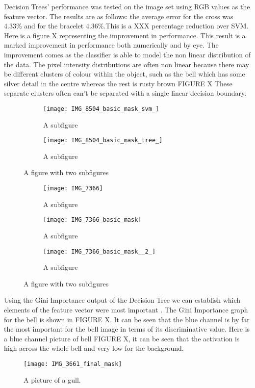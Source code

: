 \documentclass[12pt]{IIBproject}
\begin{document}
 Decision Trees' performance was tested on the image set using RGB values as the feature vector. The results are as follows: the average error for the cross was 4.33\% and for the bracelet 4.36\%.This is a XXX percentage reduction over SVM. Here is a figure X representing the improvement in performance. This result is a marked improvement in performance both numerically and by eye. The improvement comes as the classifier is able to model the non linear distribution of the data. The pixel intensity distributions are often non linear because there may be different clusters of colour within the object, such as the bell which has some silver detail in the centre whereas the rest is rusty brown FIGURE X These separate clusters often can't be separated with a single linear decision boundary.
\begin{figure}[H]
\centering
\begin{subfigure}{.5\textwidth}
  \centering
  \texttt{[image: IMG\_8504\_basic\_mask\_svm\_]}
  \caption{A subfigure}
  \label{fig:sub1}
\end{subfigure}%
\begin{subfigure}{.5\textwidth}
  \centering
  \texttt{[image: IMG\_8504\_basic\_mask\_tree\_]}
  \caption{A subfigure}
  \label{fig:sub2}
\end{subfigure}
\caption{A figure with two subfigures}
\label{fig:test}
\end{figure}
\begin{figure}[H]
\centering
\begin{subfigure}{.33\textwidth}
  \centering
  \texttt{[image: IMG\_7366]}
  \caption{A subfigure}
  \label{fig:sub1}
\end{subfigure}%
\begin{subfigure}{.33\textwidth}
  \centering
  \texttt{[image: IMG\_7366\_basic\_mask]}
  \caption{A subfigure}
  \label{fig:sub2}
\end{subfigure}
\begin{subfigure}{.33\textwidth}
  \centering
  \texttt{[image: IMG\_7366\_basic\_mask\_\_2\_]}
  \caption{A subfigure}
  \label{fig:sub2}
\end{subfigure}
\caption{A figure with two subfigures}
\label{fig:test}
\end{figure}

Using the Gini Importance output of the Decision Tree we can establish which elements of the feature vector were most important . The Gini Importance graph for the bell is shown in FIGURE X. It can be seen that the blue channel is by far the most important for the bell image in terms of its discriminative value. Here is a blue channel picture of bell FIGURE X, it can be seen that the activation is high across the whole bell and very low for the background.
\begin{figure}[H]
  \caption{A picture of a gull.}
  \centering
    \texttt{[image: IMG\_3661\_final\_mask]}
\end{figure}
\end{document}
